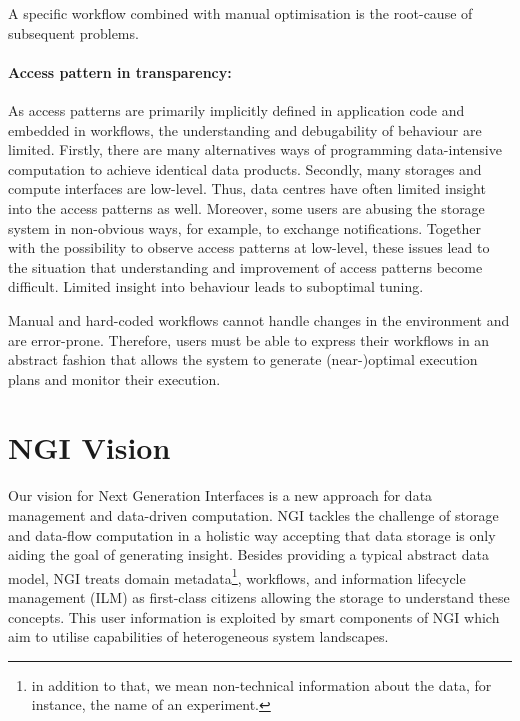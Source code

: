 \documentclass[a4paper, twocolumn]{article}
\begin{document}
\medskip

A specific workflow combined with manual optimisation is the root-cause of subsequent problems.

\paragraph{Access pattern in transparency:}
As access patterns are primarily implicitly defined in application code and embedded in workflows, the understanding and debugability of behaviour are limited.
Firstly, there are many alternatives ways of programming data-intensive computation to achieve identical data products.
Secondly, many storages and compute interfaces are low-level.
Thus, data centres have often limited insight into the access patterns as well.
Moreover, some users are abusing the storage system in non-obvious ways, for example, to exchange notifications.
Together with the possibility to observe access patterns at low-level, these issues lead to the situation that understanding and improvement of access patterns become difficult.
Limited insight into behaviour leads to suboptimal tuning.

Manual and hard-coded workflows cannot handle changes in the environment and are error-prone.
Therefore, users must be able to express their workflows in an abstract fashion that allows the system to generate (near-)optimal execution plans and monitor their execution.


\section{NGI Vision}
\label{sec:ngiVision}

Our vision for Next Generation Interfaces is a new approach for data management and data-driven computation.
NGI tackles the challenge of storage and data-flow computation in a holistic way accepting that data storage is only aiding the goal of generating insight.
Besides providing a typical abstract data model, NGI treats domain metadata\footnote{ in addition to that, we mean non-technical information about the data, for instance, the name of an experiment.}, workflows, and information lifecycle management (ILM) as first-class citizens allowing the storage to understand these concepts.
This user information is exploited by smart components of NGI which aim to utilise capabilities of heterogeneous system landscapes.
\end{document}

